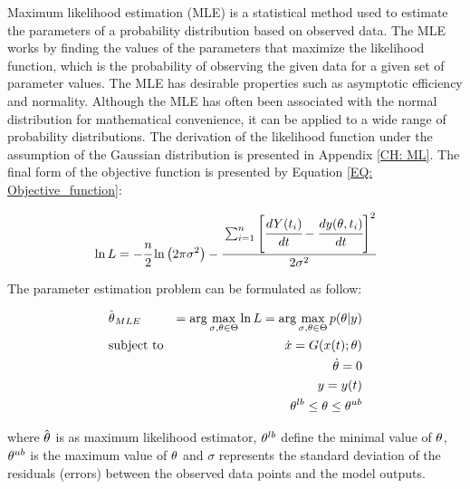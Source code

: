 \documentclass[../Article_Model_Parameters.tex]{subfiles}
\begin{document}
	Maximum likelihood estimation (MLE) is a statistical method used to estimate the parameters of a probability distribution based on observed data. The MLE works by finding the values of the parameters that maximize the likelihood function, which is the probability of observing the given data for a given set of parameter values. The MLE has desirable properties such as asymptotic efficiency and normality. Although the MLE has often been associated with the normal distribution for mathematical convenience, it can be applied to a wide range of probability distributions. The derivation of the likelihood function under the assumption of the Gaussian distribution is presented in Appendix \ref{CH: ML}. The final form of the objective function is presented by Equation \ref{EQ: Objective_function}:
	
	{\footnotesize
		\begin{equation} \label{EQ: Objective_function}
			\ln L = -\cfrac{n}{2}  \ln \left(2 \pi \sigma^2\right) 
			- \cfrac{ \sum_{i=1}^{n} \left[  \cfrac{d {Y}(t_i)}{dt} - \cfrac{d{\color{black}y}({\color{black} \theta}, t_i)}{dt} \right]^2 }{2 {\color{black} \sigma}^2}
		\end{equation}
	}
	
	The parameter estimation problem can be formulated as follow:
	
	{\footnotesize
		\begin{equation}
			\begin{aligned} \label{EQ: Optimization_formulation_MLE}
				&\hat{{\color{black} \theta}}_{MLE} &= \arg \max_{{\color{black} \sigma}, {\color{black} \theta} \in \Theta} \ln L = \arg \max_{{\color{black} \sigma},{\color{black} \theta} \in \Theta} p({\color{black} \theta}|{\color{black}y}) \\
				&\text{subject to}
				& \dot{ {\color{black}x} } = {\color{black}G}({\color{black} x}(t);{\color{black} \theta}) \\
				&& {\color{black} \dot{\theta}} = 0 \\
				&& {\color{black}y} = {\color{black}y}(t) \\
				&& {\color{black} \theta}^{lb} \leq {\color{black} \theta} \leq {\color{black} \theta}^{ub}
			\end{aligned}
	\end{equation} } 
	
	where $\hat{{\color{black} \theta}}$ is as maximum likelihood estimator, ${\color{black} \theta}^{lb}$ define the minimal value of ${\color{black} \theta}$, ${\color{black} \theta}^{ub}$ is the maximum value of ${\color{black} \theta}$ and $\sigma$ represents the standard deviation of the residuals (errors) between the observed data points and the model outputs.
	
\end{document}
